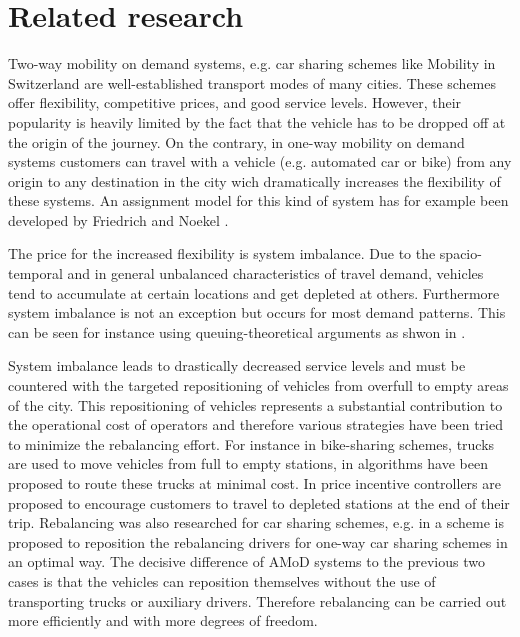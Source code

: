 \section{Related research}
\label{subs:literatureResearch}

Two-way mobility on demand systems, e.g. car sharing schemes like Mobility in
Switzerland \citep{katzev2003car} are well-established transport modes
of many cities. These schemes offer flexibility, competitive prices, and good
service levels. However, their popularity is heavily limited by the fact that
the vehicle has to be dropped off at the origin of the journey. On the contrary,
in one-way mobility on demand systems customers can travel with a vehicle (e.g.
automated car or bike) from any origin to any destination in the city wich
dramatically increases the flexibility of these systems. An assignment model for this 
kind of system has for example been developed by Friedrich and Noekel \cite{Friedrich2015a}.

The price for the increased flexibility is system imbalance. Due to the
spacio-temporal and in general unbalanced characteristics of travel demand,
vehicles tend to accumulate at certain locations and get depleted at others.
Furthermore system imbalance is not an exception but occurs for most demand
patterns. This can be seen for instance using queuing-theoretical arguments
as shwon in \citep{zhang2016control}.

System imbalance leads to drastically decreased service levels and must be
countered with the targeted repositioning of vehicles from overfull to empty
areas of the city. This repositioning of vehicles represents a substantial
contribution to the operational cost of operators and therefore various strategies
have been tried to minimize the rebalancing effort. For instance in bike-sharing
schemes, trucks are used to move vehicles from full to empty stations, in
\citep{pfrommer2014dynamic} algorithms have been proposed to route these
trucks at minimal cost. In \citep{ruch2014rule} price incentive controllers
are proposed to encourage customers to travel to depleted stations at the end
of their trip. Rebalancing was also researched for car sharing schemes, e.g.
in \citep{smith2013rebalancing} a scheme is proposed to reposition the
rebalancing drivers for one-way car sharing schemes in an optimal way. The
decisive difference of AMoD systems to the previous two
cases is that the vehicles can reposition themselves without the use of transporting
trucks or auxiliary drivers. Therefore rebalancing can be carried out more efficiently
and with more degrees of freedom.

